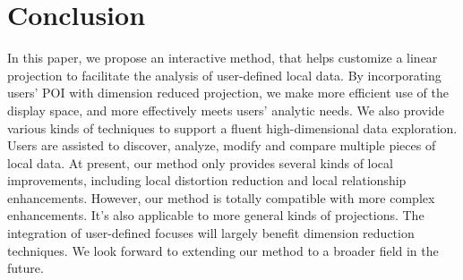 \section{Conclusion}
In this paper, we propose an interactive method, that helps customize a linear projection to facilitate the analysis of user-defined local data. By incorporating users' POI with dimension reduced projection, we make more efficient use of the display space, and more effectively meets users' analytic needs. We also provide various kinds of techniques to support a fluent high-dimensional data exploration. Users are assisted to discover, analyze, modify and compare multiple pieces of local data. At present, our method only provides several kinds of local improvements, including local distortion reduction and local relationship enhancements. However, our method is totally compatible with more complex enhancements. It's also applicable to more general kinds of projections. The integration of user-defined focuses will largely benefit dimension reduction techniques. We look forward to extending our method to a broader field in the future.